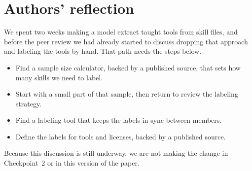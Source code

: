 \section{Authors' reflection}
\label{sec:reflection}

We spent two weeks making a model extract taught tools from skill files, and before the peer review we had already started to discuss dropping that approach and labeling the tools by hand.
That path needs the steps below.

\begin{itemize}
  \item Find a sample size calculator, backed by a published source, that sets how many skills we need to label.
  \item Start with a small part of that sample, then return to review the labeling strategy.
  \item Find a labeling tool that keeps the labels in sync between members.
  \item Define the labels for tools and licenses, backed by a published source.
\end{itemize}

Because this discussion is still underway, we are not making the change in Checkpoint~2 or in this version of the paper.

